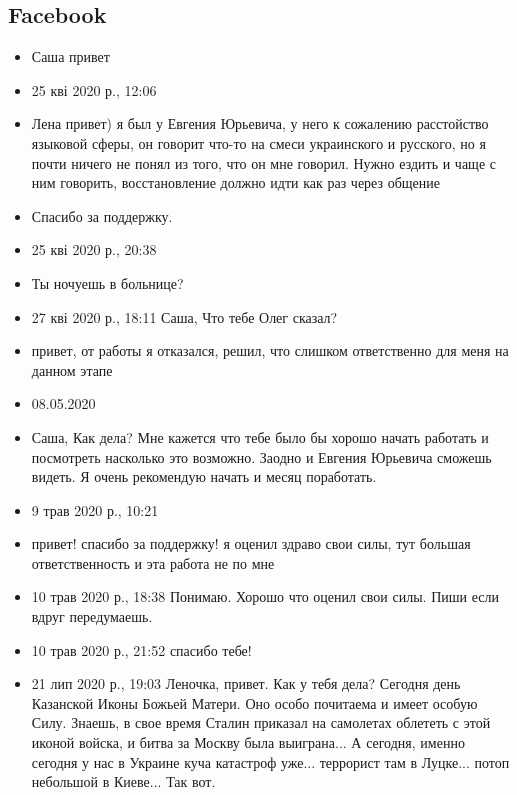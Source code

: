  
 
\subsection{Facebook}
  
\begin{itemize}
\item Саша привет
\item 25 кві 2020 р., 12:06
\item Лена привет) я был у Евгения Юрьевича, у него к сожалению расстойство
        языковой сферы, он говорит что-то на смеси украинского и русского, но я
        почти ничего не понял из того, что он мне говорил. Нужно ездить и чаще
        с ним говорить, восстановление должно идти как раз через общение
\item Спасибо за поддержку.
\item 25 кві 2020 р., 20:38
\item Ты ночуешь в больнице?
\item 27 кві 2020 р., 18:11
Саша, Что тебе Олег сказал?
\item привет, от работы я отказался, решил, что слишком ответственно для меня на данном этапе
\item 08.05.2020
\item Саша,
Как дела?  Мне кажется что тебе было бы хорошо начать работать и посмотреть
                насколько это возможно. Заодно и Евгения Юрьевича сможешь
                видеть. Я очень рекомендую начать и месяц поработать.
\item 9 трав 2020 р., 10:21
\item привет! спасибо за поддержку! я оценил здраво свои силы, тут большая ответственность и эта работа не по мне
\item 10 трав 2020 р., 18:38 Понимаю. Хорошо что оценил свои силы. Пиши если
        вдруг передумаешь.
\item 10 трав 2020 р., 21:52
спасибо тебе!
\item 21 лип 2020 р., 19:03 Леночка, привет. Как у тебя дела? Сегодня день
        Казанской Иконы Божьей Матери. Оно особо почитаема и имеет особую Силу.
                Знаешь, в свое время Сталин приказал на самолетах облететь с
                этой иконой войска, и битва за Москву была выиграна... А
                сегодня, именно сегодня у нас в Украине куча катастроф уже...
                террорист там в Луцке... потоп небольшой в Киеве... Так вот.

\end{itemize}
